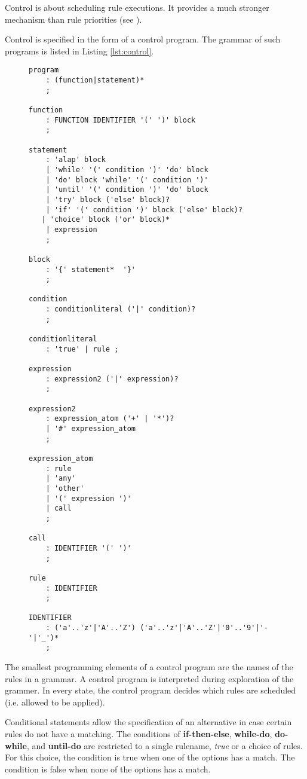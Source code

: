 Control is about scheduling rule executions. It provides a much stronger
mechanism than rule priorities (see ).

Control is specified in the form of a control program. The grammar of such programs is listed in Listing \ref{lst:control}. 

\lstset{
	basicstyle=\ttfamily\scriptsize
}

\begin{figure}
\begin{lstlisting}[label=lst:control,caption={Grammar of Control Programs}]
program
	: (function|statement)*
	;

function
	: FUNCTION IDENTIFIER '(' ')' block
	;

statement 
	: 'alap' block
	| 'while' '(' condition ')' 'do' block
	| 'do' block 'while' '(' condition ')'
	| 'until' '(' condition ')' 'do' block
	| 'try' block ('else' block)?
	| 'if' '(' condition ')' block ('else' block)?
   | 'choice' block ('or' block)*
	| expression
	;

block
	: '{' statement*  '}'
	;

condition
	: conditionliteral ('|' condition)?
	;

conditionliteral
	: 'true' | rule ;

expression	
	: expression2 ('|' expression)?
	;

expression2
    : expression_atom ('+' | '*')?
    | '#' expression_atom
    ;

expression_atom
	: rule
	| 'any'
	| 'other'
	| '(' expression ')'
	| call
	; 

call
	: IDENTIFIER '(' ')'
	;

rule
	: IDENTIFIER
	;

IDENTIFIER
	: ('a'..'z'|'A'..'Z') ('a'..'z'|'A'..'Z'|'0'..'9'|'-'|'_')*
	;
\end{lstlisting}
\end{figure}

The smallest programming elements of a control program are the names of the rules in a grammar. A control program is interpreted during exploration of the grammer. In every state, the control program decides which rules are scheduled (i.e. allowed to be applied). 

Conditional statements allow the specification of an alternative in case certain rules do not have a matching. The conditions of \textbf{if-then-else}, \textbf{while-do}, \textbf{do-while}, and \textbf{until-do} are restricted to a single rulename, \emph{true} or a choice of rules. For this choice, the condition is true when one of the options has a match. The condition is false when none of the options has a match. 

